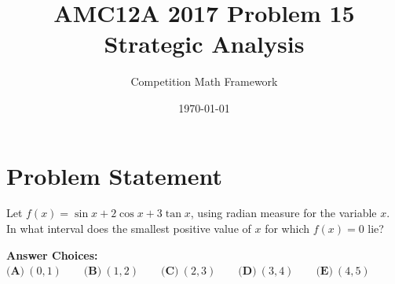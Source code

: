 \documentclass[]{article}
\begin{document}
\title{\textbf{AMC12A 2017 Problem 15\\Strategic Analysis}}
\author{Competition Math Framework}
\date{\today}
\maketitle

\section*{Problem Statement}

Let $f(x) = \sin{x} + 2\cos{x} + 3\tan{x}$, using radian measure for the variable $x$. In what interval does the smallest positive value of $x$ for which $f(x) = 0$ lie?

\vspace{0.5em}
\textbf{Answer Choices:}\\
$\textbf{(A)}\ (0,1) \qquad \textbf{(B)}\ (1, 2) \qquad\textbf{(C)}\ (2, 3) \qquad\textbf{(D)}\ (3, 4) \qquad\textbf{(E)}\ (4,5)$
\end{document}
